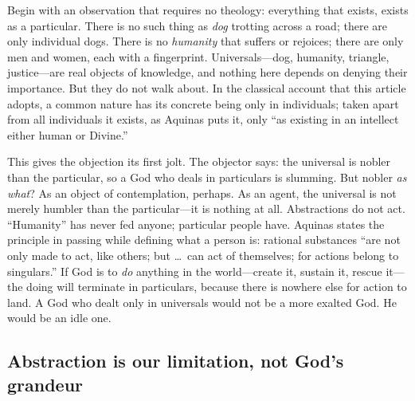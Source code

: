 Begin with an observation that requires no theology: everything that exists, exists as a particular. There is no such thing as \emph{dog} trotting across a road; there are only individual dogs. There is no \emph{humanity} that suffers or rejoices; there are only men and women, each with a fingerprint. Universals---dog, humanity, triangle, justice---are real objects of knowledge, and nothing here depends on denying their importance. But they do not walk about. In the classical account that this article adopts, a common nature has its concrete being only in individuals; taken apart from all individuals it exists, as Aquinas puts it, only ``as existing in an intellect either human or Divine.''

This gives the objection its first jolt. The objector says: the universal is nobler than the particular, so a God who deals in particulars is slumming. But nobler \emph{as what}? As an object of contemplation, perhaps. As an agent, the universal is not merely humbler than the particular---it is nothing at all. Abstractions do not act. ``Humanity'' has never fed anyone; particular people have. Aquinas states the principle in passing while defining what a person is: rational substances ``are not only made to act, like others; but \ldots\ can act of themselves; for actions belong to singulars.'' If God is to \emph{do} anything in the world---create it, sustain it, rescue it---the doing will terminate in particulars, because there is nowhere else for action to land. A God who dealt only in universals would not be a more exalted God. He would be an idle one.

\subsection{Abstraction is our limitation, not God's grandeur}

